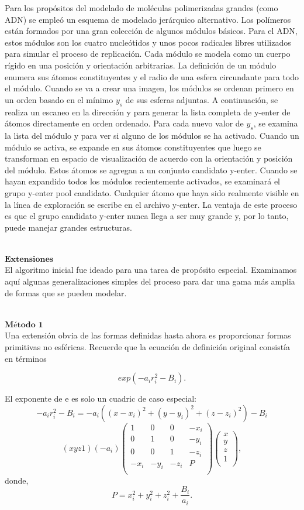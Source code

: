 Para los propósitos del modelado de moléculas polimerizadas grandes (como ADN) se empleó un esquema de modelado jerárquico alternativo. Los polímeros están formados por una gran colección de algunos módulos básicos. Para el ADN, estos módulos son los cuatro nucleótidos y unos pocos radicales libres utilizados para simular el proceso de replicación. Cada módulo se modela como un cuerpo rígido en una posición y orientación arbitrarias. La definición de un módulo enumera sus átomos constituyentes y el radio de una esfera circundante para todo el módulo. Cuando se va a crear una imagen, los módulos se ordenan primero en un orden basado en el mínimo $ y_s $ de sus esferas adjuntas. A continuación, se realiza un escaneo en la dirección y para generar la lista completa de y-enter de átomos directamente en orden ordenado. Para cada nuevo valor de $ y_s $, se examina la lista del módulo y para ver si alguno de los módulos se ha activado. Cuando un módulo se activa, se expande en sus átomos constituyentes que luego se transforman en espacio de visualización de acuerdo con la orientación y posición del módulo. Estos átomos se agregan a un conjunto candidato y-enter. Cuando se hayan expandido todos los módulos recientemente activados, se examinará el grupo y-enter pool candidato. Cualquier átomo que haya sido realmente visible en la línea de exploración se escribe en el archivo y-enter. La ventaja de este proceso es que el grupo candidato y-enter nunca llega a ser muy grande y, por lo tanto, puede manejar grandes estructuras.

${ }$\\
$\textbf{Extensiones}$
${ }$\\

El algoritmo inicial fue ideado para una tarea de propósito especial. Examinamos aquí algunas generalizaciones simples del proceso para dar una gama más amplia de formas que se pueden modelar.

${ }$\\
$\textbf{Método 1}$
${ }$\\

Una extensión obvia de las formas definidas hasta ahora es proporcionar formas primitivas no esféricas. Recuerde que la ecuación de definición original consistía en términos

\[
	exp(-a_i r^{2}_{i} - B_i).
\]

El exponente de e es solo un cuadric de caso especial:
\[
	-a_i r^{2}_{i} - B_i = -a_i((x - x_i)^2 + (y - y_i)^2 + (z - z_i)^2) - B_i
\]
\[
	(xyz1)(-a_i)  \left( {\begin{array}{cccc}
		1 & 0 & 0 & -x_i \\
		0 & 1 & 0 & -y_i \\
		0 & 0 & 1 & -z_i \\
		-x_i & -y_i & -z_i & P\\
		\end{array} } \right) \left( {\begin{array}{cccc}
		x \\
		y \\
		z \\
		1 \\
		\end{array} } \right),
\]
donde,
\[
	P = x^{2}_{i} + y^{2}_{i} + z^{2}_{i} + \frac{B_i}{a_i}.
\]

